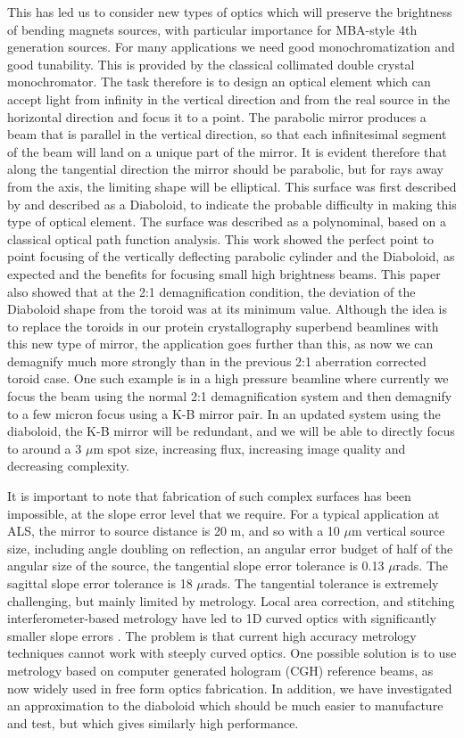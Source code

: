 \documentclass{iucr}              %
\newcommand{\inblue}[1]{{\color{blue}#1}}
\begin{document}
This has led us to consider new types of optics which will preserve the brightness of bending magnets sources, with particular importance for MBA-style 4th generation sources.   
For many applications we need good monochromatization and good tunability.  This is provided by the classical collimated double crystal monochromator.  The task therefore is to design an optical element which can accept light from infinity in the vertical direction and from the real source in the horizontal direction and focus it to a point.  The parabolic mirror produces a beam that is parallel in the vertical direction, so that each infinitesimal segment of the beam will land on a unique part of the mirror.  It is evident therefore that along the tangential direction the mirror should be parabolic, but for rays away from the axis, the limiting shape will be elliptical. 
\inblue{This surface was first described by \cite{McKinneySPIE2009} and described as a Diaboloid, to indicate the probable difficulty in making this type of optical element.  The surface was described as a polynominal, based on a classical optical path function analysis.  This work showed the perfect point to point focusing of the vertically deflecting parabolic cylinder and the Diaboloid, as expected and the benefits for focusing small high brightness beams.  This paper also showed that at the 2:1 demagnification condition, the deviation of the Diaboloid shape from the toroid was at its minimum value.} Although the idea is to replace the toroids in our protein crystallography superbend beamlines with this new type of mirror, the application goes further than this, as now we can demagnify much more strongly than in the previous 2:1 aberration corrected toroid case.  One such example is in a high pressure beamline where currently we focus the beam using the normal 2:1 demagnification system and then demagnify to a few micron focus using a K-B mirror pair.  In an updated system using the diaboloid, the K-B mirror will be redundant, and we will be able to directly focus to around a 3 $\mu$m spot size, increasing flux, increasing image quality and decreasing complexity.

It is important to note that fabrication of such complex surfaces has been impossible, at the slope error level that we require.  For a typical application at ALS, the mirror to source distance is 20 m, and so with a 10 $\mu$m vertical source size, including angle doubling on reflection, an angular error budget of half of the angular size of the source, the tangential slope error tolerance is 0.13 $\mu$rads.  The sagittal slope error tolerance is 18 $\mu$rads.  The tangential tolerance is extremely challenging, but mainly limited by metrology.  Local area correction, and stitching interferometer-based metrology have led to 1D curved optics with significantly smaller slope errors \cite{Yamauchi2002}.  The problem is that current high accuracy metrology techniques cannot work with steeply curved optics.  One possible solution is to use metrology based on computer generated hologram (CGH) reference beams, as now widely used in free form optics fabrication. In addition, we have investigated an approximation to the diaboloid which should be much easier to manufacture and test, but which gives similarly high performance. 
\end{document}
